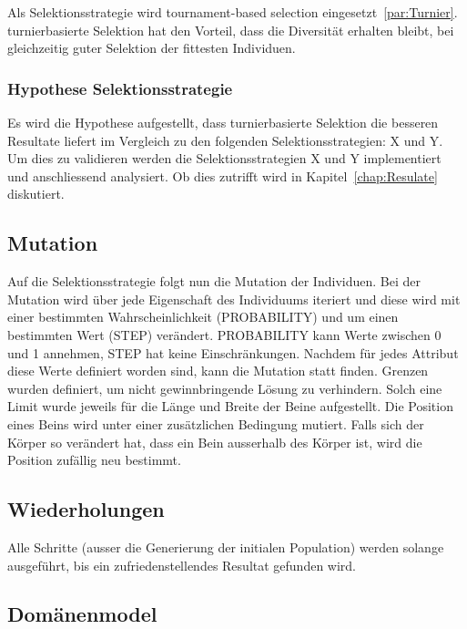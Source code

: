       Als Selektionsstrategie wird tournament-based selection eingesetzt~\ref{par:Turnier}.
      turnierbasierte Selektion hat den Vorteil, dass die Diversität erhalten bleibt,
      bei gleichzeitig guter Selektion der fittesten Individuen.

      \subsubsection{Hypothese Selektionsstrategie\label{sub:Hypothese Selektionsstratgegie}}

        Es wird die Hypothese aufgestellt,
        dass turnierbasierte Selektion die besseren Resultate liefert im Vergleich zu den folgenden Selektionsstrategien: X und Y.
        Um dies zu validieren werden die Selektionsstrategien X und Y implementiert und anschliessend analysiert.
        Ob dies zutrifft wird in Kapitel~\ref{chap:Resulate} diskutiert.

    \subsection{Mutation\label{sec:Mutation}}

      Auf die Selektionsstrategie folgt nun die Mutation der Individuen.
      Bei der Mutation wird über jede Eigenschaft des Individuums iteriert und
      diese wird mit einer bestimmten Wahrscheinlichkeit (PROBABILITY) und um einen bestimmten Wert (STEP) verändert.
      PROBABILITY kann Werte zwischen 0 und 1 annehmen, STEP hat keine Einschränkungen.
      Nachdem für jedes Attribut diese Werte definiert worden sind, kann die Mutation statt finden.
      Grenzen wurden definiert, um nicht gewinnbringende Lösung zu verhindern.
      Solch eine Limit wurde jeweils für die Länge und Breite der Beine aufgestellt.
      Die Position eines Beins wird unter einer zusätzlichen Bedingung mutiert. Falls sich der Körper so verändert hat,
      dass ein Bein ausserhalb des Körper ist, wird die Position zufällig neu bestimmt.

    \subsection{Wiederholungen}

      Alle Schritte (ausser die Generierung der initialen Population) werden solange ausgeführt,
      bis ein zufriedenstellendes Resultat gefunden wird.

    \subsection{Domänenmodel\label{sub:domMod}}

